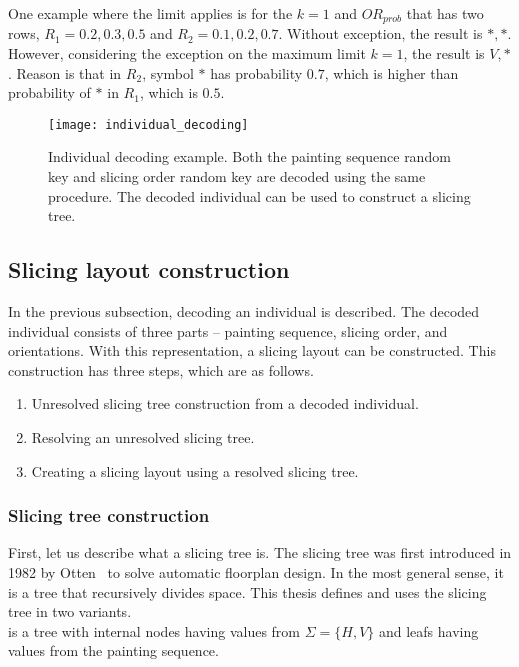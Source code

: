 One example where the limit applies is for the $k=1$ and $OR_{prob}$ that has two rows, $R_1 = 0.2, 0.3, 0.5$ and $R_2 = 0.1, 0.2, 0.7$.
Without exception, the result is $*, *$.
However, considering the exception on the maximum limit $k=1$, the result is $V, *$.
Reason is that in $R_2$, symbol $*$ has probability $0.7$,
which is higher than probability of $*$ in $R_1$, which is $0.5$.

\begin{figure}[h!]
    \texttt{[image: individual\_decoding]}
    \caption{
        Individual decoding example. Both the painting sequence random key and slicing order random key
        are decoded using the same procedure. The decoded individual can be used to construct a slicing tree.
    }
    \label{fig:individual-decoding}
\end{figure}

\subsection{Slicing layout construction}\label{subsec:slicing-tree-construction}
In the previous subsection, decoding an individual is described.
The decoded individual consists of three parts – painting sequence, slicing order, and orientations.
With this representation, a slicing layout can be constructed.
This construction has three steps, which are as follows.

\begin{enumerate}
    \item Unresolved slicing tree construction from a decoded individual.
    \item Resolving an unresolved slicing tree.
    \item Creating a slicing layout using a resolved slicing tree.
\end{enumerate}

\subsubsection*{Slicing tree construction}

First, let us describe what a slicing tree is.
The slicing tree was first introduced in 1982 by Otten~\cite{ottenAutomaticFloorplanDesign1982} to solve automatic floorplan design.
In the most general sense, it is a tree that recursively divides space.
This thesis defines and uses the slicing tree in two variants.\\

 is a tree with internal nodes having values from $\Sigma = \{H, V\}$
and leafs having values from the painting sequence.\\

